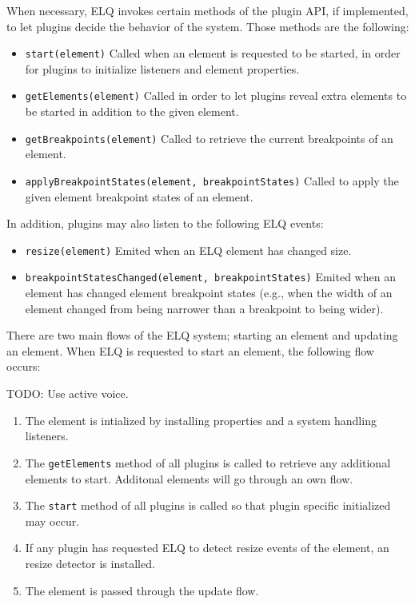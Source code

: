 \documentclass{acm_proc_article-sp}
\newcommand{\code}[1]{\texttt{#1}}
\newcommand{\elq}{ELQ}
\begin{document}
  When necessary, \elq{} invokes certain methods of the plugin API, if implemented, to let plugins decide the behavior of the system.
  Those methods are the following:
  \begin{itemize}
    \item \code{start(element)}
          Called when an element is requested to be started, in order for plugins to initialize listeners and element properties.
    \item \code{getElements(element)}
          Called in order to let plugins reveal extra elements to be started in addition to the given element.
    \item \code{getBreakpoints(element)}
          Called to retrieve the current breakpoints of an element.
    \item \code{applyBreakpointStates(element, breakpointStates)}
          Called to apply the given element breakpoint states of an element.
  \end{itemize}

  In addition, plugins may also listen to the following \elq{} events:
  \begin{itemize}
    \item \code{resize(element)}
          Emited when an \elq{} element has changed size.
    \item \code{breakpointStatesChanged(element, breakpointStates)}
          Emited when an element has changed element breakpoint states (e.g., when the width of an element changed from being narrower than a breakpoint to being wider).
  \end{itemize}

  There are two main flows of the \elq{} system; starting an element and updating an element.
  When \elq{} is requested to start an element, the following flow occurs:

  TODO: Use active voice.

  \begin{enumerate}
    \item The element is intialized by installing properties and a system handling listeners.
    \item 
          The \code{getElements} method of all plugins is called to retrieve any additional elements to start.
          Additonal elements will go through an own flow.
    \item The \code{start} method of all plugins is called so that plugin specific initialized may occur.
    \item If any plugin has requested \elq{} to detect resize events of the element, an resize detector is installed.
    \item The element is passed through the update flow.
  \end{enumerate}
\end{document}
